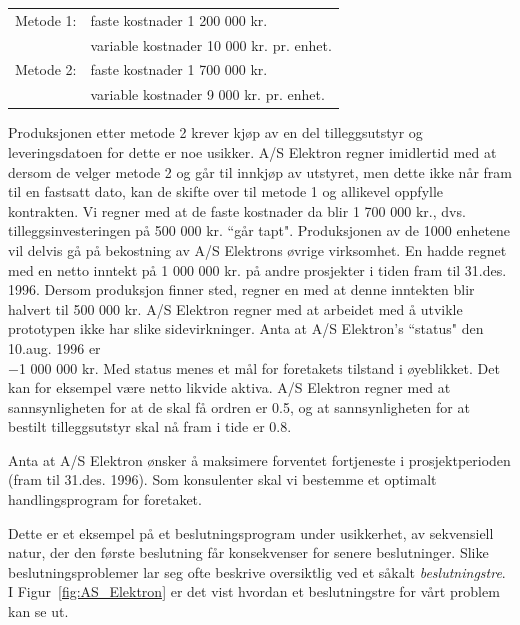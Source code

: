 {{\begin{center}
\begin{tabular}{ll}
 Metode 1: & faste kostnader 1 200 000 kr. \\
           & variable kostnader 10 000 kr. pr. enhet.\\[1mm]
 Metode 2: & faste kostnader 1 700 000 kr. \\
           & variable kostnader 9 000 kr. pr. enhet.
\end{tabular}
\end{center}
Produksjonen etter metode 2 krever kjøp av en del tilleggsutstyr og 
leve\-rings\-datoen for dette er noe usikker.  A/S Elektron regner imidlertid
med at dersom de velger metode 2 og går til innkjøp av utstyret,
men dette ikke når fram til en fastsatt dato, kan de skifte over til
metode 1 og allikevel oppfylle kontrakten.  Vi regner med at de faste 
kostnader da blir 1 700 000 kr., dvs. tilleggsinvesteringen på
500 000 kr. ``går tapt".  Produksjonen av de 1000 enhetene vil delvis
gå på bekostning av A/S Elektrons øvrige virksomhet.  En 
hadde regnet med en netto inntekt på 1 000 000 kr. på andre
prosjekter i tiden fram til 31.des. 1996.  Dersom produksjon finner sted,
regner en med at denne inntekten blir halvert til 500 000 kr.  A/S Elektron
regner med at arbeidet med å utvikle prototypen ikke har slike
sidevirkninger.  Anta at A/S Elektron's ``status" den 10.aug. 1996 er\\
$-$1 000 000 kr.  Med status menes et mål for foretakets tilstand i
øyeblikket.  Det kan for eksempel være netto likvide aktiva. 
A/S Elektron regner med at sannsynligheten for at de skal få ordren
er 0.5, og at sannsynligheten for at bestilt tilleggsutstyr skal nå
fram i tide er 0.8.

Anta at A/S Elektron ønsker å maksimere forventet fortjeneste i 
pro\-sjekt\-perioden (fram til 31.des. 1996).  Som konsulenter skal vi 
bestemme et optimalt handlingsprogram for foretaket.

Dette er et eksempel på et beslutningsprogram under usikkerhet, av
sekvensiell natur, der den første beslutning får konsekvenser for
senere beslutninger.  Slike beslutningsproblemer lar seg ofte beskrive
oversiktlig ved et såkalt {\em beslutningstre}.  I Figur~\ref{fig:AS_Elektron} er det
vist hvordan et beslutningstre for vårt problem kan se ut.

}}
